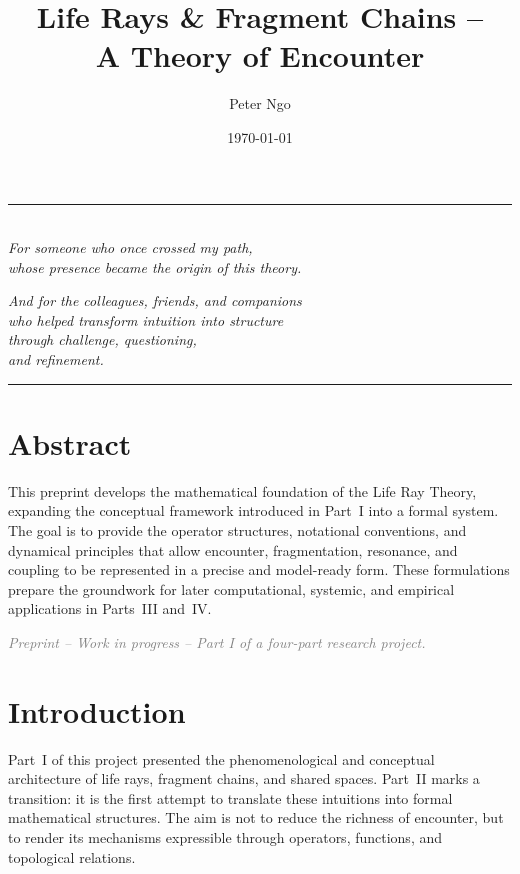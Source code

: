 \documentclass[12pt,a4paper]{article}
\title{\textbf{Life Rays \& Fragment Chains --\\
A Theory of Encounter}}
\author{Peter Ngo}
\date{\today}
\begin{document}
\maketitle

\vspace{1.5em}
\begin{center}
\rule{0.45\textwidth}{0.4pt}\\[1em]

\textit{
For someone who once crossed my path,\\
whose presence became the origin of this theory.
}

\vspace{0.6em}

\textit{
And for the colleagues, friends, and companions\\
who helped transform intuition into structure\\
through challenge, questioning,\\
and refinement.
}

\rule{0.45\textwidth}{0.4pt}
\end{center}
\vspace{2em}

\tableofcontents
\newpage
\onehalfspacing

\section{Abstract}
This preprint develops the mathematical foundation of the Life Ray Theory, expanding the
conceptual framework introduced in Part~I into a formal system. The goal is to provide
the operator structures, notational conventions, and dynamical principles that allow
encounter, fragmentation, resonance, and coupling to be represented in a precise and
model-ready form. These formulations prepare the groundwork for later computational,
systemic, and empirical applications in Parts~III and~IV.


\vspace{1em}
\begin{center}
\textcolor{gray}{\small \textit{Preprint – Work in progress – Part I of a four-part research project.}}
\end{center}
\vspace{1em}

\section{Introduction}
Part~I of this project presented the phenomenological and conceptual architecture of
life rays, fragment chains, and shared spaces. Part~II marks a transition: it is the first
attempt to translate these intuitions into formal mathematical structures. The aim is not
to reduce the richness of encounter, but to render its mechanisms expressible through
operators, functions, and topological relations.
\end{document}
